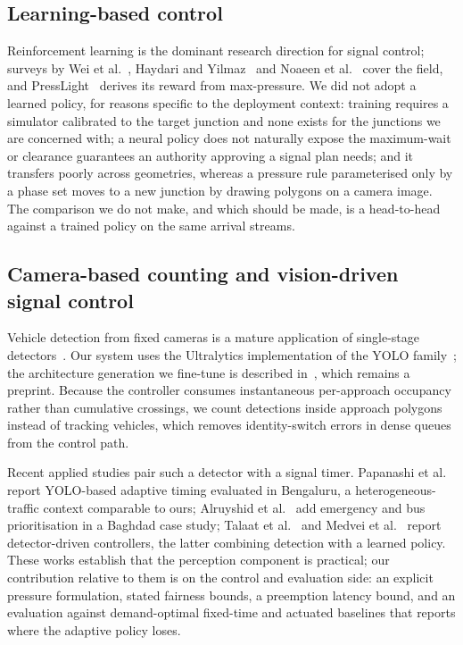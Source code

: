 \documentclass[journal]{IEEEtran}
\begin{document}
\subsection{Learning-based control}

Reinforcement learning is the dominant research direction for signal control; surveys by Wei et
al.~\cite{wei2021recent}, Haydari and Yilmaz~\cite{haydari2022deep} and Noaeen et al.~\cite{noaeen2022reinforcement}
cover the field, and PressLight~\cite{wei2019presslight} derives its reward from max-pressure. We did not adopt
a learned policy, for reasons specific to the deployment context: training requires a simulator calibrated to
the target junction and none exists for the junctions we are concerned with; a neural policy does not
naturally expose the maximum-wait or clearance guarantees an authority approving a signal plan needs; and it
transfers poorly across geometries, whereas a pressure rule parameterised only by a phase set moves to a new
junction by drawing polygons on a camera image. The comparison we do not make, and which should be made, is a
head-to-head against a trained policy on the same arrival streams.

\subsection{Camera-based counting and vision-driven signal control}

Vehicle detection from fixed cameras is a mature application of single-stage
detectors~\cite{redmon2016yolo,bochkovskiy2020yolov4}. Our system uses the
Ultralytics implementation of the YOLO family~\cite{jocher2023yolov8}; the architecture generation we
fine-tune is described in~\cite{khanam2024yolov11}, which remains a preprint. Because the controller consumes
instantaneous per-approach occupancy rather than cumulative crossings, we count detections inside approach
polygons instead of tracking vehicles, which removes identity-switch errors in dense queues from the control
path.

Recent applied studies pair such a detector with a signal timer. Papanashi et al.~\cite{papanashi2024adaptive}
report YOLO-based adaptive timing evaluated in Bengaluru, a heterogeneous-traffic context comparable to ours;
Alruyshid et al.~\cite{alruyshid2025aibased} add emergency and bus prioritisation in a Baghdad case study;
Talaat et al.~\cite{talaat2025smart} and Medvei et al.~\cite{medvei2025deepsignal} report detector-driven
controllers, the latter combining detection with a learned policy. These works establish that the perception component is practical; our contribution relative to them is on
the control and evaluation side: an explicit
pressure formulation, stated fairness bounds, a preemption latency bound, and an evaluation against
demand-optimal fixed-time and actuated baselines that reports where the adaptive policy loses.
\end{document}
